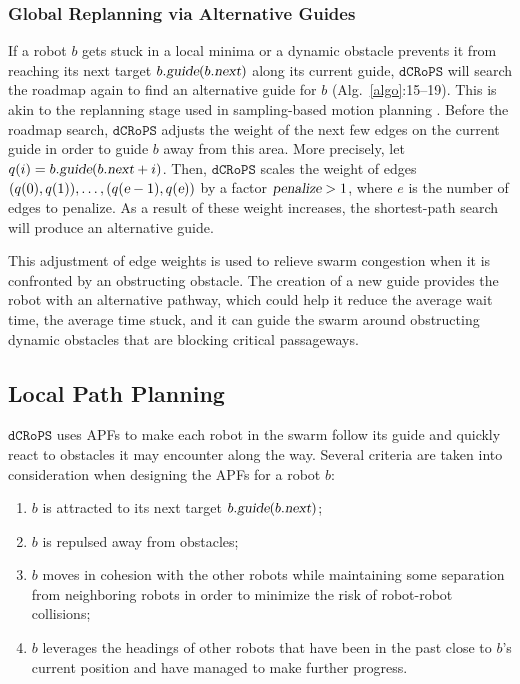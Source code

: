 \documentclass[letterpaper, 10pt, conference]{ieeeconf}
\newcommand{\Acronym}[1]{\ensuremath{{{\texttt{#1}}}}}
\newcommand{\Var}[1]{\ensuremath{{{\textsl{#1}}}}}
\newcommand{\Name}{\Acronym{dCRoPS}}
\begin{document}
\subsubsection{Global Replanning via Alternative Guides}
\label{sec:Branching}
If a robot $b$ gets stuck in a local minima or a dynamic obstacle
prevents it from reaching its next target
$b.\Var{guide}(b.\Var{next})$ along its current guide, $\Name$ will
search the roadmap again to find an alternative guide for $b$
(Alg.~\ref{algo}:15--19). This is akin to the replanning stage used in
sampling-based motion planning
\cite{van2006anytime,ferguson2006anytime,karaman2011anytime}.  Before
the roadmap search, $\Name$ adjusts the weight of the next few edges
on the current guide in order to guide $b$ away from this area.  More
precisely, let $q(i) = b.\Var{guide}(b.\Var{next} + i)$. Then, $\Name$
scales the weight of edges $(q(0), q(1)), \ldots, (q(\Var{e} - 1),
q(\Var{e}))$ by a factor $\Var{penalize} > 1$,
where $e$ is the number of edges to penalize. As a result of these
weight increases, the shortest-path search will produce an alternative
guide.

 This adjustment of edge weights is used to relieve swarm congestion
 when it is confronted by an obstructing obstacle. The creation of a
 new guide provides the robot with an alternative pathway, which could
 help it reduce the average wait time, the average time stuck, and it
 can guide the swarm around obstructing dynamic obstacles that are
 blocking critical passageways.

\subsection{Local Path Planning}
\label{sec:Local}

$\Name$ uses APFs to make each robot in the swarm follow its
guide and quickly react to obstacles it may encounter along the way.
Several criteria are taken into consideration when designing
the APFs for a robot $b$:
\begin{enumerate}
\item $b$ is attracted to its next target $b.\Var{guide}(b.\Var{next})$;
\item $b$ is repulsed away from obstacles;
\item $b$ moves in cohesion with the other robots while maintaining some separation from neighboring robots in order
  to minimize the risk of robot-robot collisions;
\item $b$ leverages the headings of
other robots that have been in the past close to $b$'s current position and have
managed to make further progress.
\end{enumerate}
\end{document}
